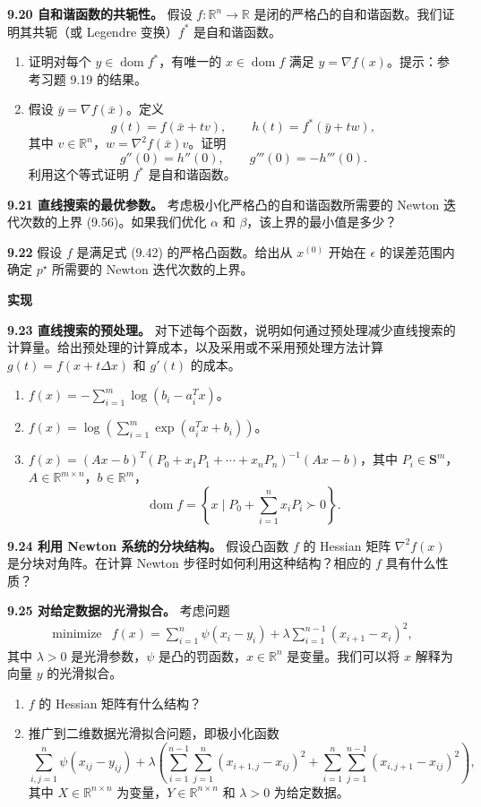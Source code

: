 \documentclass[UTF8,12pt,a4paper,fontset=fandol]{ctexart}
\begin{document}
\noindent\textbf{9.20 自和谐函数的共轭性。}\quad
假设 $f:\mathbb{R}^n\to\mathbb{R}$ 是闭的严格凸的自和谐函数。我们证明其共轭（或 Legendre 变换）$f^\ast$ 是自和谐函数。
\begin{enumerate}
\item[(a)] 证明对每个 $y\in\operatorname{dom} f^\ast$，有唯一的 $x\in\operatorname{dom} f$ 满足 $y=\nabla f(x)$。提示：参考习题 9.19 的结果。
\item[(b)] 假设 $\bar y=\nabla f(\bar x)$。定义
\[
g(t)=f(\bar x+tv),\qquad h(t)=f^\ast(\bar y+tw),
\]
其中 $v\in\mathbb{R}^n$，$w=\nabla^2 f(\bar x)v$。证明
\[
g''(0)=h''(0),\qquad g'''(0)=-h'''(0).
\]
利用这个等式证明 $f^\ast$ 是自和谐函数。
\end{enumerate}

\noindent\textbf{9.21 直线搜索的最优参数。}\quad
考虑极小化严格凸的自和谐函数所需要的 Newton 迭代次数的上界 (9.56)。如果我们优化 $\alpha$ 和 $\beta$，该上界的最小值是多少？

\noindent\textbf{9.22}\quad
假设 $f$ 是满足式 (9.42) 的严格凸函数。给出从 $x^{(0)}$ 开始在 $\epsilon$ 的误差范围内确定 $p^\star$ 所需要的 Newton 迭代次数的上界。

\noindent\textbf{实现}

\noindent\textbf{9.23 直线搜索的预处理。}\quad
对下述每个函数，说明如何通过预处理减少直线搜索的计算量。给出预处理的计算成本，以及采用或不采用预处理方法计算 $g(t)=f(x+t\Delta x)$ 和 $g'(t)$ 的成本。
\begin{enumerate}
\item[(a)] $f(x)=-\sum_{i=1}^m\log(b_i-a_i^Tx)$。
\item[(b)] $f(x)=\log\left(\sum_{i=1}^m\exp(a_i^Tx+b_i)\right)$。
\item[(c)] $f(x)=(Ax-b)^T(P_0+x_1P_1+\cdots+x_nP_n)^{-1}(Ax-b)$，其中 $P_i\in\mathbf{S}^m$，$A\in\mathbb{R}^{m\times n}$，$b\in\mathbb{R}^m$，
\[
\operatorname{dom} f=\left\{x\mid P_0+\sum_{i=1}^n x_iP_i\succ0\right\}.
\]
\end{enumerate}

\noindent\textbf{9.24 利用 Newton 系统的分块结构。}\quad
假设凸函数 $f$ 的 Hessian 矩阵 $\nabla^2 f(x)$ 是分块对角阵。在计算 Newton 步径时如何利用这种结构？相应的 $f$ 具有什么性质？

\noindent\textbf{9.25 对给定数据的光滑拟合。}\quad
考虑问题
\[
\begin{array}{ll}
\mbox{minimize} & f(x)=\displaystyle\sum_{i=1}^n\psi(x_i-y_i)+\lambda\sum_{i=1}^{n-1}(x_{i+1}-x_i)^2,
\end{array}
\]
其中 $\lambda>0$ 是光滑参数，$\psi$ 是凸的罚函数，$x\in\mathbb{R}^n$ 是变量。我们可以将 $x$ 解释为向量 $y$ 的光滑拟合。
\begin{enumerate}
\item[(a)] $f$ 的 Hessian 矩阵有什么结构？
\item[(b)] 推广到二维数据光滑拟合问题，即极小化函数
\[
\sum_{i,j=1}^n\psi(x_{ij}-y_{ij})+\lambda\left(
\sum_{i=1}^{n-1}\sum_{j=1}^n(x_{i+1,j}-x_{ij})^2+
\sum_{i=1}^n\sum_{j=1}^{n-1}(x_{i,j+1}-x_{ij})^2\right),
\]
其中 $X\in\mathbb{R}^{n\times n}$ 为变量，$Y\in\mathbb{R}^{n\times n}$ 和 $\lambda>0$ 为给定数据。
\end{enumerate}
\end{document}
